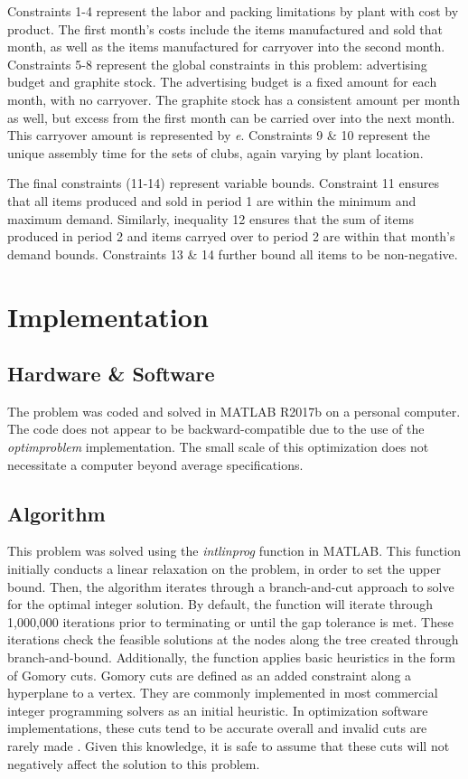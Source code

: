 \documentclass{article}
\begin{document}
Constraints 1-4 represent the labor and packing limitations by plant with cost by product.  The first month's costs include the items manufactured and sold that month, as well as the items manufactured 
for carryover into the second month.  Constraints 5-8 represent the global constraints in this problem:  advertising budget and graphite stock.  The advertising budget is a fixed amount for each month, with no carryover. The 
graphite stock has a consistent amount per month as well, but excess from the first month can be carried over into the next month.  This carryover amount is represented by \textit{e}.  Constraints 9 \& 10 represent the unique assembly time 
for the sets of clubs, again varying by plant location. 
\par
The final constraints (11-14) represent variable bounds.  Constraint 11 ensures that all items produced and sold in period 1 are within the minimum and maximum demand.  Similarly, inequality 12 ensures that the sum of items produced in period 2 and items carryed over to 
period 2 are within that month's demand bounds.  Constraints 13 \& 14 further bound all items to be non-negative.


\section{Implementation}
\subsection{Hardware \& Software}
The problem was coded and solved in MATLAB R2017b on a personal computer.  The code does not appear to be backward-compatible due to the use of the \textit{optimproblem} implementation.  The small scale of this optimization does not necessitate a computer beyond average specifications.
\subsection{Algorithm}
This problem was solved using the \textit{intlinprog} function in MATLAB.  This function initially conducts a linear relaxation on the problem, in order to set the upper bound.  Then, the algorithm iterates through a branch-and-cut approach to solve for the optimal integer solution.  By default, the function 
will iterate through 1,000,000 iterations prior to terminating or until the gap tolerance is met.  These iterations check the feasible solutions at the nodes along the tree created through branch-and-bound.  Additionally, the function applies basic heuristics in the form of Gomory cuts.  Gomory cuts are defined as an added constraint along a hyperplane to a vertex.  They are commonly implemented in most commercial integer programming solvers as an initial heuristic.  In optimization software implementations, these cuts tend to be accurate overall and invalid cuts are rarely made \cite{gomory}.  Given this knowledge, it is safe to assume that these cuts will not negatively affect the solution to this problem.
\end{document}
